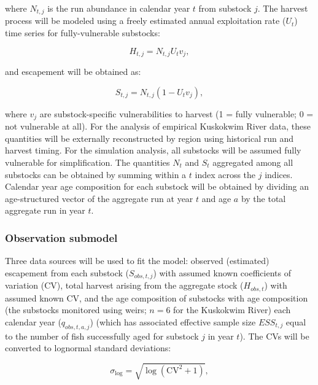 \documentclass[12pt,]{book}
\theoremstyle{definition}
\theoremstyle{definition}
\theoremstyle{definition}
\theoremstyle{remark}
\begin{document}
\noindent
where \(N_{t,j}\) is the run abundance in calendar year \(t\) from
substock \(j\). The harvest process will be modeled using a freely
estimated annual exploitation rate (\(U_t\)) time series for
fully-vulnerable substocks:

\begin{equation}
  H_{t,j}=N_{t,j} U_t v_j,
  \label{eq:tsm-get-H}
\end{equation}

\noindent
and escapement will be obtained as:

\begin{equation}
  S_{t,j}=N_{t,j} (1 - U_t v_j),
  \label{eq:tsm-get-S}
\end{equation}

\noindent
where \(v_j\) are substock-specific vulnerabilities to harvest (1 =
fully vulnerable; 0 = not vulnerable at all). For the analysis of
empirical Kuskokwim River data, these quantities will be externally
reconstructed by region using historical run and harvest timing. For the
simulation analysis, all substocks will be assumed fully vulnerable for
simplification. The quantities \(N_t\) and \(S_t\) aggregated among all
substocks can be obtained by summing within a \(t\) index across the
\(j\) indices. Calendar year age composition for each substock will be
obtained by dividing an age-structured vector of the aggregate run at
year \(t\) and age \(a\) by the total aggregate run in year \(t\).

\subsubsection{Observation submodel}\label{observation-submodel}

\noindent
Three data sources will be used to fit the model: observed (estimated)
escapement from each substock (\(S_{obs,t,j}\)) with assumed known
coefficients of variation (CV), total harvest arising from the aggregate
stock (\(H_{obs,t}\)) with assumed known CV, and the age composition of
substocks with age composition (the substocks monitored using weirs;
\(n = 6\) for the Kuskokwim River) each calendar year
(\(q_{obs,t,a,j}\)) (which has associated effective sample size
\(ESS_{t,j}\) equal to the number of fish successfully aged for substock
\(j\) in year \(t\)). The CVs will be converted to lognormal standard
deviations:

\begin{equation}
  \sigma_{\text{log}}=\sqrt{\log(\text{CV}^2+1)},
  \label{eq:cv2sig}
\end{equation}
\end{document}
